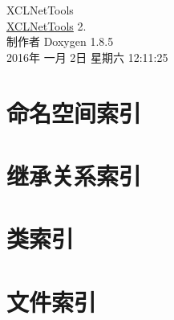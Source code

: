 \documentclass[twoside]{book}
\newcommand{\clearemptydoublepage}{%
  \newpage{\pagestyle{empty}\cleardoublepage}%
}
\begin{document}
\hypersetup{pageanchor=false}
\begin{titlepage}
\vspace*{7cm}
\begin{center}%
{\Large X\-C\-L\-Net\-Tools \\[1ex]\large \hyperlink{namespace_x_c_l_net_tools}{X\-C\-L\-Net\-Tools} 2. }\\
\vspace*{1cm}
{\large 制作者 Doxygen 1.8.5}\\
\vspace*{0.5cm}
{\small 2016年 一月 2日 星期六 12:11:25}\\
\end{center}
\end{titlepage}
\clearemptydoublepage
\tableofcontents
\clearemptydoublepage
{}
\hypersetup{pageanchor=true}

\chapter{命名空间索引}

\chapter{继承关系索引}

\chapter{类索引}

\chapter{文件索引}

\end{document}
